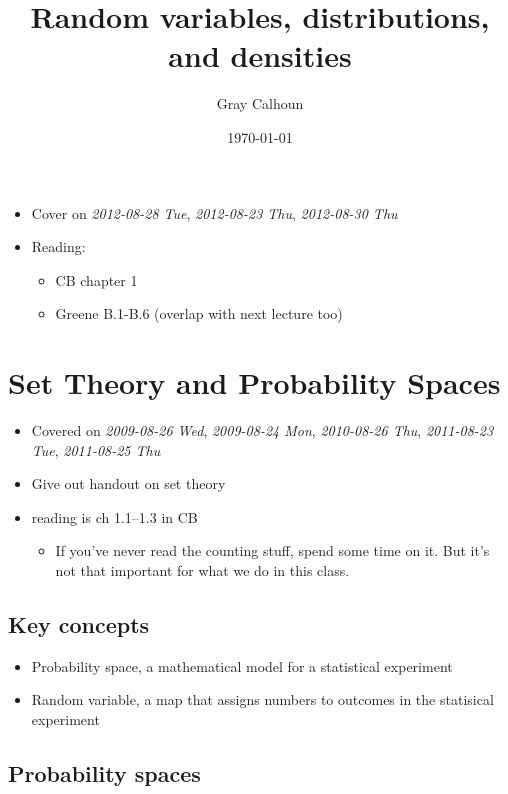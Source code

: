 \documentclass[11pt]{article}
\title{Random variables, distributions, and densities}
\author{Gray Calhoun}
\date{\today}
\begin{document}
\maketitle

\setcounter{tocdepth}{2}
\tableofcontents
\vspace*{1cm}
\begin{itemize}
\item Cover on \textit{2012-08-28 Tue}, \textit{2012-08-23 Thu}, \textit{2012-08-30 Thu}
\item Reading:
\begin{itemize}
\item CB chapter 1
\item Greene B.1-B.6 (overlap with next lecture too)
\end{itemize}
\end{itemize}
\section{Set Theory and Probability Spaces}
\label{sec-1}

\begin{itemize}
\item Covered on \textit{2009-08-26 Wed}, \textit{2009-08-24 Mon}, \textit{2010-08-26 Thu},
      \textit{2011-08-23 Tue}, \textit{2011-08-25 Thu}
\item Give out handout on set theory
\item reading is ch 1.1--1.3 in CB
\begin{itemize}
\item If you've never read the counting
        stuff, spend some time on it.  But it's not that important for
        what we do in this class.
\end{itemize}
\end{itemize}
\subsection{Key concepts}
\label{sec-1-1}

\begin{itemize}
\item Probability space, a mathematical model for a statistical experiment
\item Random variable, a map that assigns numbers to outcomes in the
       statisical experiment
\end{itemize}
\subsection{Probability spaces}
\label{sec-1-2}
\end{document}
